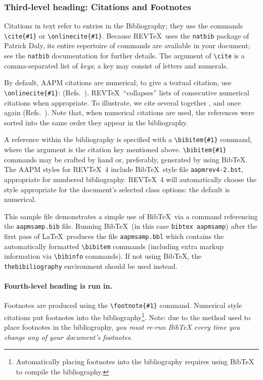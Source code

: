 \documentclass[%
 aapm,
 mph,%
 amsmath,amssymb,
 reprint,%
]{revtex4-2}
\begin{document}
\subsubsection{\label{sec:level3}Third-level heading: Citations and Footnotes}

Citations in text refer to entries in the Bibliography;
they use the commands \verb+\cite{#1}+ or \verb+\onlinecite{#1}+. 
Because REV\TeX\ uses the \verb+natbib+ package of Patrick Daly, 
its entire repertoire of commands are available in your document;
see the \verb+natbib+ documentation for further details.
The argument of \verb+\cite+ is a comma-separated list of \emph{keys};
a key may consist of letters and numerals. 

By default, AAPM citations are numerical; \cite{feyn54} 
to give a textual citation, use \verb+\onlinecite{#1}+: (Refs.~). 
REV\TeX\ ``collapses'' lists of consecutive numerical citations when appropriate. 
To illustrate, we cite several together \cite{feyn54,witten2001,epr,Berman1983}, 
and once again (Refs.~). 
Note that, when numerical citations are used, the references were sorted into the same order they appear in the bibliography. 

A reference within the bibliography is specified with a \verb+\bibitem{#1}+ command,
where the argument is the citation key mentioned above. 
\verb+\bibitem{#1}+ commands may be crafted by hand or, preferably,
generated by using Bib\TeX. 
The AAPM styles for REV\TeX~4 include Bib\TeX\ style file
\verb+aapmrev4-2.bst+, appropriate for
numbered bibliography. 
REV\TeX~4 will automatically choose the style appropriate for 
the document's selected class options: the default is numerical.

This sample file demonstrates a simple use of Bib\TeX\ 
via a \verb++ command referencing the \verb+aapmsamp.bib+ file.
Running Bib\TeX\ (in this case \texttt{bibtex
aapmsamp}) after the first pass of \LaTeX\ produces the file
\verb+aapmsamp.bbl+ which contains the automatically formatted
\verb+\bibitem+ commands (including extra markup information via
\verb+\bibinfo+ commands). If not using Bib\TeX, the
\verb+thebibiliography+ environment should be used instead.

\paragraph{Fourth-level heading is run in.}%
Footnotes are produced using the \verb+\footnote{#1}+ command. 
Numerical style citations put footnotes into the 
bibliography\footnote{Automatically placing footnotes into the bibliography requires using BibTeX to compile the bibliography.}.
Note: due to the method used to place footnotes in the bibliography, \emph{you
must re-run BibTeX every time you change any of your document's
footnotes}. 
\end{document}
